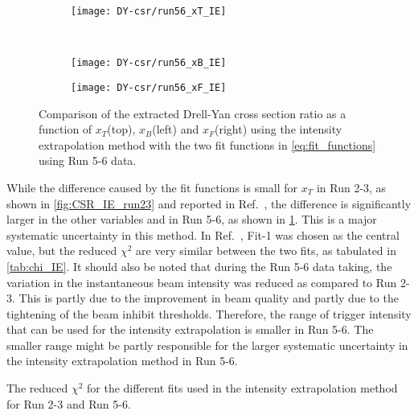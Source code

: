 \documentclass[../main.tex]{subfiles}
\begin{document}
\begin{figure}[h!]
	\centering
	\begin{subfigure}{0.6\linewidth}
		\texttt{[image: DY-csr/run56\_xT\_IE]}
	\end{subfigure}\\
	\begin{subfigure}{0.45\linewidth}
		\texttt{[image: DY-csr/run56\_xB\_IE]}
	\end{subfigure}
	\begin{subfigure}{0.45\linewidth}
		\texttt{[image: DY-csr/run56\_xF\_IE]}
	\end{subfigure}
	\caption{Comparison of the extracted Drell-Yan cross section ratio as a function of $x_T$(top),
		$x_B$(left) and $x_F$(right) using the intensity extrapolation method with the two fit functions in \cref{eq:fit_functions}
		using Run 5-6 data.}
	\label{fig:CSR_IE_run56}
\end{figure}

While the difference caused by the fit functions is small for $x_T$ in Run 2-3,
as shown in \cref{fig:CSR_IE_run23} and reported in Ref.~\cite{dove2021},
the difference is significantly larger in the other variables and in Run 5-6, as shown in \cref{fig:CSR_IE_run56}.
This is a major systematic uncertainty in this method.
In Ref.~\cite{dove2021}, Fit-1 was chosen as the central value, but the reduced $\chi^2$ are very similar between the two fits,
as tabulated in \cref{tab:chi_IE}.
It should also be noted that during the Run 5-6 data taking, the variation in the instantaneous beam
intensity was reduced as compared to Run 2-3.
This is partly due to the improvement in beam quality and partly due to the tightening of the beam inhibit thresholds.
Therefore, the range of trigger intensity that can be used for the intensity extrapolation is smaller in Run 5-6.
The smaller range might be partly responsible for the larger systematic uncertainty in the intensity extrapolation method
in Run 5-6.
\begin{table}[h!]
	\centering
	\caption{The reduced $\chi^2$ for the different fits used in the intensity extrapolation method for Run 2-3 and Run 5-6. }
	\label{tab:chi_IE}
	
\end{table}
\end{document}
